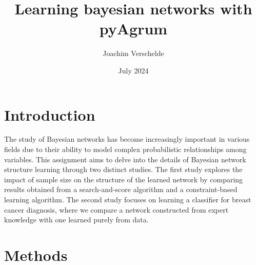\documentclass{article}
\title{Learning bayesian networks with pyAgrum}
\author{Joachim Verschelde}
\date{July 2024}
\begin{document}
\maketitle
\section{Introduction}
The study of Bayesian networks has become increasingly important in various fields due to their ability to model complex probabilistic relationships among variables.
 This assignment aims to delve into the details of Bayesian network structure learning through two distinct studies. 
 The first study explores the impact of sample size on the structure of the learned network by comparing results obtained from a search-and-score algorithm and a constraint-based learning algorithm.
 The second study focuses on learning a classifier for breast cancer diagnosis, where we compare a network constructed from expert knowledge with one learned purely from data.
\section{Methods}
\end{document}
